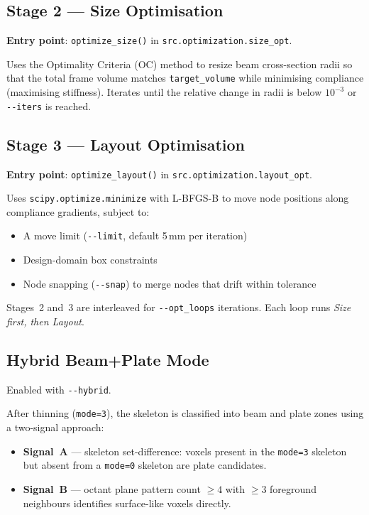 \documentclass[a4paper, 11pt, openany]{report}
\begin{document}
\subsection{Stage 2 --- Size Optimisation}
\label{sec:stage2}

\textbf{Entry point}: \texttt{optimize\_size()} in \texttt{src.optimization.size\_opt}.

Uses the Optimality Criteria (OC) method to resize beam cross-section radii so
that the total frame volume matches \texttt{target\_volume} while minimising
compliance (maximising stiffness).  Iterates until the relative change in radii
is below $10^{-3}$ or \texttt{-{}-iters} is reached.


\subsection{Stage 3 --- Layout Optimisation}
\label{sec:stage3}

\textbf{Entry point}: \texttt{optimize\_layout()} in
\texttt{src.optimization.layout\_opt}.

Uses \texttt{scipy.optimize.minimize} with L-BFGS-B to move node positions
along compliance gradients, subject to:
\begin{itemize}[nosep]
    \item A move limit (\texttt{-{}-limit}, default 5\,mm per iteration)
    \item Design-domain box constraints
    \item Node snapping (\texttt{-{}-snap}) to merge nodes that drift within tolerance
\end{itemize}

Stages~2 and~3 are interleaved for \texttt{-{}-opt\_loops} iterations.  Each loop
runs \emph{Size first, then Layout}.


\subsection{Hybrid Beam+Plate Mode}
\label{sec:hybrid}

Enabled with \texttt{-{}-hybrid}.

After thinning (\texttt{mode=3}), the skeleton is classified into beam and plate
zones using a two-signal approach:

\begin{itemize}[nosep]
    \item \textbf{Signal~A} --- skeleton set-difference: voxels present in the
          \texttt{mode=3} skeleton but absent from a \texttt{mode=0} skeleton are
          plate candidates.
    \item \textbf{Signal~B} --- octant plane pattern count $\ge 4$ with $\ge 3$
          foreground neighbours identifies surface-like voxels directly.
\end{itemize}
\end{document}
